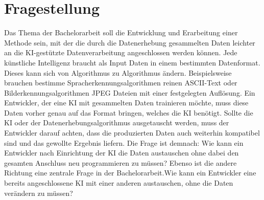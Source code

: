 \section{Fragestellung}
Das Thema der Bachelorarbeit soll die Entwicklung und Erarbeitung einer Methode sein, mit der die durch die Datenerhebung gesammelten Daten leichter an die KI-gestützte Datenverarbeitung angeschlossen werden können. Jede künstliche Intelligenz braucht als Input Daten in einem bestimmten Datenformat. Dieses kann sich von Algorithmus zu Algorithmus ändern. Beispielsweise brauchen bestimme Spracherkennungsalgorithmen reinen ASCII-Text oder Bilderkennungsalgorithmen JPEG Dateien mit einer festgelegten Auflösung. Ein Entwickler, der eine KI mit gesammelten Daten trainieren möchte, muss diese Daten vorher genau auf das Format bringen, welches die KI benötigt. Sollte die KI oder der Datenerhebungsalgorithmus ausgetauscht werden, muss der Entwickler darauf achten, dass die produzierten Daten auch weiterhin kompatibel sind und das gewollte Ergebnis liefern. Die Frage ist demnach: \glqq Wie kann ein Entwickler nach Einrichtung der KI die Daten austauschen ohne dabei den gesamten Anschluss neu programmieren zu müssen?\grqq{} Ebenso ist die andere Richtung eine zentrale Frage in der Bachelorarbeit.\glqq Wie kann ein Entwickler eine bereits angeschlossene KI mit einer anderen austauschen, ohne die Daten verändern zu müssen?\grqq{}